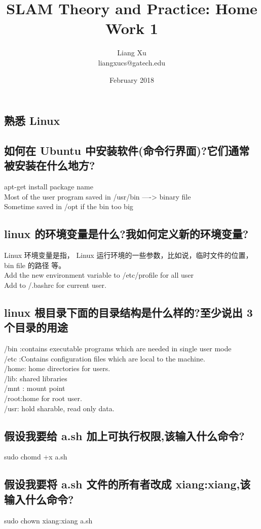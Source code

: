 \documentclass{article}
\title{SLAM Theory and Practice: Home Work 1}
\author{Liang Xu \\ liangxucs@gatech.edu}
\date{February 2018}
\begin{document}
\begin{CJK*}{UTF8}{gbsn}
\maketitle

\section{熟悉 Linux}
\subsection{如何在 Ubuntu 中安装软件(命令行界面)?它们通常被安装在什么地方?}
	apt-get install {package name}\\
	Most of the user program saved in /usr/bin ----> binary file\\
	Sometime saved in /opt if the bin too big
\subsection{linux 的环境变量是什么?我如何定义新的环境变量?}
Linux 环境变量是指， Linux 运行环境的一些参数，比如说，临时文件的位置，bin file 的路径 等。\\
Add the new environment variable to /etc/profile for all user\\
Add to /.bashrc for current user.

\subsection{linux 根目录下面的目录结构是什么样的?至少说出 3 个目录的用途}
/bin :contains executable programs which are needed in single user mode\\
/etc :Contains configuration files which are local to the machine.\\
/home: home directories for users. \\
/lib: shared libraries\\
/mnt : mount point \\
/root:home for root user.\\ 
/usr: hold sharable, read only data. 

\subsection{假设我要给 a.sh 加上可执行权限,该输入什么命令?}
sudo chomd +x a.sh

\subsection{假设我要将 a.sh 文件的所有者改成 xiang:xiang,该输入什么命令?}
sudo chown xiang:xiang a.sh


\end{CJK*}
\end{document}
